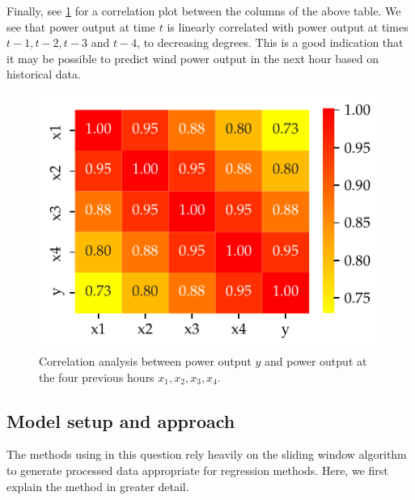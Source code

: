 \documentclass[11pt]{article}
\begin{document}
Finally, see \cref{fig:q3-corr-analysis} for a correlation plot between the columns of the above table.
We see that power output at time $t$ is linearly correlated with power output at times $t-1, t-2, t-3$ and $t-4$, to decreasing degrees.
This is a good indication that it may be possible to predict wind power output in the next hour based on historical data.

\begin{figure}
  \centering
  \includegraphics{figures/q3_corr_analysis.pdf}
  \caption{Correlation analysis between power output $y$ and power output at the four previous hours $x_1, x_2, x_3, x_4$.}
  \label{fig:q3-corr-analysis}
\end{figure}



\subsection*{Model setup and approach}

The methods using in this question rely heavily on the sliding window algorithm to generate processed data appropriate for regression methods.
Here, we first explain the method in greater detail.
\end{document}
